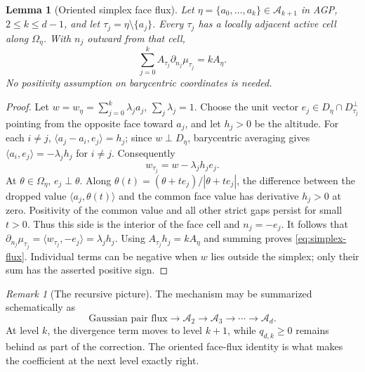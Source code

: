 \documentclass[10pt,reqno]{amsart}
\newtheorem{lemma}[theorem]{Lemma}
\theoremstyle{definition}
\theoremstyle{remark}
\newtheorem{remark}[theorem]{Remark}
\newcommand{\ip}[2]{\langle #1,#2\rangle}
\begin{document}
\begin{lemma}[Oriented simplex face flux]\label{lem:simplex-flux}
Let $\eta=\{a_0,\ldots,a_k\}\in\mathcal A_{k+1}$ in AGP, $2\le k\le d-1$, and let $\tau_j=\eta\setminus\{a_j\}$. Every $\tau_j$ has a locally adjacent active cell along $\Omega_\eta$. With $n_j$ outward from that cell,
\begin{equation}\label{eq:simplex-flux}
\sum_{j=0}^k A_{\tau_j}\partial_{n_j}\mu_{\tau_j}=kA_\eta.
\end{equation}
No positivity assumption on barycentric coordinates is needed.
\end{lemma}
\begin{proof}
Let $w=w_\eta=\sum_{j=0}^k\lambda_j a_j$, $\sum_j\lambda_j=1$.
Choose the unit vector $e_j\in D_\eta\cap D_{\tau_j}^{\perp}$ pointing from the opposite face toward $a_j$, and let $h_j>0$ be the altitude. For each $i\ne j$,
$\ip{a_j-a_i}{e_j}=h_j$; since $w\perp D_\eta$, barycentric averaging gives
$\ip{a_i}{e_j}=-\lambda_jh_j$ for $i\ne j$. Consequently
\[
w_{\tau_j}=w-\lambda_jh_je_j.
\]
At $\theta\in\Omega_\eta$, $e_j\perp\theta$. Along
$\theta(t)=(\theta+te_j)/|\theta+te_j|$, the difference between the dropped value $\ip{a_j}{\theta(t)}$ and the common face value has derivative $h_j>0$ at zero. Positivity of the common value and all other strict gaps persist for small $t>0$. Thus this side is the interior of the face cell and $n_j=-e_j$. It follows that
$\partial_{n_j}\mu_{\tau_j}=\ip{w_{\tau_j}}{-e_j}=\lambda_jh_j$.
Using $A_{\tau_j}h_j=kA_\eta$ and summing proves \eqref{eq:simplex-flux}. Individual terms can be negative when $w$ lies outside the simplex; only their sum has the asserted positive sign.
\end{proof}

\begin{remark}[The recursive picture]\label{rem:recursive-picture}
The mechanism may be summarized schematically as
\[
\text{Gaussian pair flux}\longrightarrow \mathcal A_2\longrightarrow \mathcal A_3\longrightarrow\cdots\longrightarrow \mathcal A_d.
\]
At level $k$, the divergence term moves to level $k+1$, while $q_{d,k}\ge0$ remains behind as part of the correction. The oriented face-flux identity is what makes the coefficient at the next level exactly right.
\end{remark}
\end{document}
